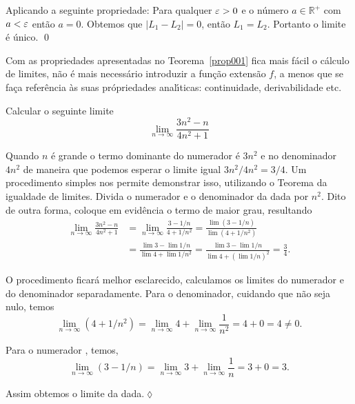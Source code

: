 Aplicando a seguinte propriedade: Para qualquer $\varepsilon>0$ e o n\'{u}mero $a\in \mathbb{R}^{+}$ com $a<\varepsilon$ ent\~{a}o $a=0$. Obtemos que
$|L_1-L_2|=0$, ent\~{a}o $L_1=L_2$. Portanto o limite \'{e} \'{u}nico. \qed

\begin{note}
Com as propriedades apresentadas no Teorema~\ref{prop001} fica mais f\'{a}cil o c\'{a}lculo de limites, n\~{a}o \'{e} mais necess\'{a}rio introduzir a fun\c{c}\~{a}o extens\~{a}o $f$, a menos que se fa\c{c}a refer\^{e}ncia \`{a}s suas pr\'{o}priedades anal\'{\i}ticas: continuidade, derivabilidade etc.
\end{note}


\begin{exer}
Calcular o seguinte limite
\begin{equation*}
\lim_{n\to\infty}\frac{3n^2-n}{4n^2+1}
\end{equation*}
\end{exer}

\solo Quando $n$ \'{e} grande o termo dominante do numerador \'{e} $3n^2$ e no denominador $4n^2$ de maneira que podemos esperar o limite igual
$3n^2/4n^2=3/4$. Um procedimento simples nos permite demonstrar isso, utilizando o Teorema da igualdade de limites. Divida o
numerador e o denominador da \seq dada por $n^2$. Dito de outra forma, coloque em evid\^{e}ncia o termo de maior grau, resultando
\begin{align*}
    \lim_{n\to\infty}\frac{3n^2-n}{4n^2+1}&=\lim_{n\to\infty}\frac{3-1/n}{4+1/n^2}
    =\frac{\lim(3-1/n)}{\lim(4+1/n^2)}\\[2ex]
    &=\frac{\lim 3-\lim 1/n}{\lim 4+\lim 1/n^2}
    =\frac{\lim 3-\lim 1/n}{\lim 4+(\lim 1/n)^2}=\frac{3}{4}.
\end{align*}

O procedimento ficar\'{a} melhor esclarecido, calculamos os limites do numerador e do denominador separadamente. Para o denominador, cuidando que n\~{a}o seja nulo, temos
\begin{equation*}
 \lim_{n\to \infty}(4+1/n^2)=\lim_{n\to \infty}4+\lim_{n\to \infty} \frac{1}{n^2}=4+0=4\neq 0.
\end{equation*}

Para o numerador , temos,
\begin{equation*}
\lim_{n\to \infty}(3-1/n)=\lim_{n\to \infty} 3+\lim_{n\to \infty}\frac{1}{n}=3+0=3.
\end{equation*}

Assim obtemos o limite da \seq dada.\hfill \(\lozenge\)


